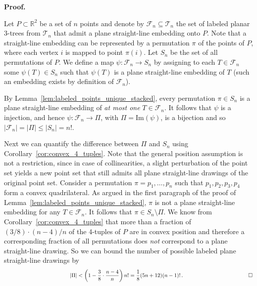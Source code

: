 \documentclass[11pt]{article}
\newcommand{\qed}{\hfill\ensuremath{\Box}}
\newenvironment{proof}{\noindent\textbf{Proof.}
}{\par\medskip}
\newcommand{\R}{\ensuremath{\mathds R}}
\newcommand{\T}{\ensuremath{\mathcal T}}
\newcommand{\F}{\ensuremath{\mathcal F}}
\begin{document}
\begin{proof}
  Let $P\subset\R^2$ be a set of $n$ points and denote by
  $\F_n\subseteq\T_n$ the set of labeled planar $3$-trees from $\T_n$
  that admit a plane straight-line embedding onto $P$. Note that a
  straight-line embedding can be represented by a permutation $\pi$ of
  the points of $P$, where each vertex $i$ is mapped to point
  $\pi(i)$. Let $S_n$ be the set of all permutations of $P$. We define
  a map $\psi : \F_n \to S_n$ by assigning to each $T\in\F_n$ some
  $\psi(T)\in S_n$ such that $\psi(T)$ is a plane straight-line
  embedding of $T$ (such an embedding exists by definition of $\F_n$).

  By Lemma~\ref{lem:labeled_points_unique_stacked}, every permutation
  $\pi\in S_n$ is a plane straight-line embedding of \emph{at most
    one} $T\in \F_n$. It follows that $\psi$ is a injection, and hence
  $\psi:\F_n\to\Pi$, with $\Pi=\mathrm{Im}(\psi)$, is a bijection and so  
  $|\F_n|=|\Pi|\le|S_n|=n!$.

  Next we can quantify the difference between $\Pi$ and $S_n$ using
  Corollary~\ref{cor:convex_4_tuples}. Note that the general position
  assumption is not a restriction, since in case of collinearities, a
  slight perturbation of the point set yields a new point set that
  still admits all plane straight-line drawings of the original point
  set. Consider a permutation $\pi=p_1,\ldots,p_n$ such that
  $p_1,p_2,p_3,p_4$ form a convex quadrilateral. As argued in the
  first paragraph of the proof of
  Lemma~\ref{lem:labeled_points_unique_stacked}, $\pi$ is not a plane
  straight-line embedding for any $T\in\F_n$. It follows that $\pi\in
  S_n\setminus\Pi$. We know from Corollary~\ref{cor:convex_4_tuples}
  that more than a fraction of $(3/8)\cdot(n-4)/n$ of the 4-tuples of
  $P$ are in convex position and therefore a corresponding fraction of
  all permutations does \emph{not} correspond to a plane straight-line
  drawing. So we can bound the number of possible labeled plane
  straight-line drawings by
  \[
  \hspace*{4.25cm}|\Pi|<\left(1-\frac{3}{8} \cdot \frac{n-4}{n}\right) n!=
  \frac{1}{8}(5n+12)(n-1)!\,.\hspace*{4.25cm}\qed
  \]
\end{proof}
\end{document}
